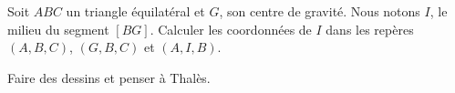 
\begin{exercice}\label{exoSeconde-0062}

    Soit \( ABC\) un triangle équilatéral et \( G\), son centre de gravité. Nous notons \( I\), le milieu du segment \( [BG]\). Calculer les coordonnées de \( I\) dans les repères \( (A,B,C)\), \( (G,B,C)\) et \( (A,I,B)\).

    Faire des dessins et penser à Thalès.

\end{exercice}

